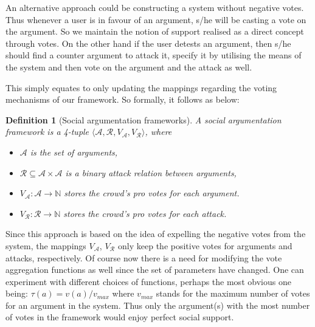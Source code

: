 \documentclass{article}
\newtheorem{definition}{Definition}
\newcommand{\nat}{\mathbb{N}}   %
\newcommand{\args}{\mathcal{A}} %
\newcommand{\att}{\mathcal{R}}  %
\newcommand{\varg}{V_{\args}}   %
\newcommand{\vatt}{V_{\att}}   %
\begin{document}
An alternative approach could be constructing a system without negative votes. Thus whenever a user is in favour of an argument, s/he will be casting a vote on the argument. So we maintain the notion of support realised as  a direct concept through votes. On the other hand if the user detests an argument, then s/he should find a counter argument to attack it, specify it by utilising the means of the system and then vote on the argument and the attack as well. {\color{red} This simply equates to only updating the mappings regarding the voting mechanisms of our framework. So formally, it follows as below:

\begin{definition}[Social argumentation frameworks]
A social argumentation framework is a 4-tuple $\langle \args, \att, \varg, \vatt \rangle$, where
\begin{itemize}
  \item $\mathcal{A}$ is the set of arguments,
  \item $\att \subseteq \args \times \args$ is a binary attack relation between arguments,
  \item $\varg : \args \to \nat$ stores the crowd's pro votes for each argument.
  \item $\vatt : \att \to \nat$ stores the crowd's pro votes for each attack.
\end{itemize}
\end{definition}

Since this approach is based on the idea of expelling the negative votes from the system, the mappings $\varg$, $\vatt$ only keep the positive votes for arguments and attacks, respectively. Of course now there is a need for modifying the vote aggregation functions as well since the set of parameters have changed. One can experiment with different choices of functions, perhaps the most obvious one being: $\tau(a) = v(a) / v_{max}$ where  $v_{max}$ stands for the maximum number of votes for an argument in the system. Thus only the argument(s) with the most number of votes in the framework would enjoy perfect social support.


}


\end{document}

